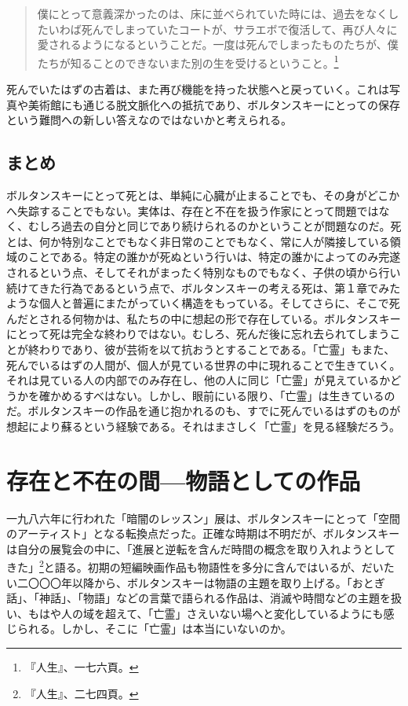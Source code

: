 \documentclass[b5j,twoside,twocolumn]{utarticle}
\begin{document}
\begin{quote}
僕にとって意義深かったのは、床に並べられていた時には、過去をなくしたいわば死んでしまっていたコートが、サラエボで復活して、再び人々に愛されるようになるということだ。一度は死んでしまったものたちが、僕たちが知ることのできないまた別の生を受けるということ。\footnote{『人生』、一七六頁。}
\end{quote}


死んでいたはずの古着は、また再び機能を持った状態へと戻っていく。これは写真や美術館にも通じる脱文脈化への抵抗であり、ボルタンスキーにとっての保存という難問への新しい答えなのではないかと考えられる。
\subsection{まとめ}
ボルタンスキーにとって死とは、単純に心臓が止まることでも、その身がどこかへ失踪することでもない。実体は、存在と不在を扱う作家にとって問題ではなく、むしろ過去の自分と同じであり続けられるのかということが問題なのだ。死とは、何か特別なことでもなく非日常のことでもなく、常に人が隣接している領域のことである。特定の誰かが死ぬという行いは、特定の誰かによってのみ完遂されるという点、そしてそれがまったく特別なものでもなく、子供の頃から行い続けてきた行為であるという点で、ボルタンスキーの考える死は、第１章でみたような個人と普遍にまたがっていく構造をもっている。そしてさらに、そこで死んだとされる何物かは、私たちの中に想起の形で存在している。ボルタンスキーにとって死は完全な終わりではない。むしろ、死んだ後に忘れ去られてしまうことが終わりであり、彼が芸術を以て抗おうとすることである。「亡霊」もまた、死んでいるはずの人間が、個人が見ている世界の中に現れることで生きていく。それは見ている人の内部でのみ存在し、他の人に同じ「亡霊」が見えているかどうかを確かめるすべはない。しかし、眼前にいる限り、「亡霊」は生きているのだ。ボルタンスキーの作品を通じ抱かれるのも、すでに死んでいるはずのものが想起により蘇るという経験である。それはまさしく「亡霊」を見る経験だろう。

\section{存在と不在の間—物語としての作品}
一九八六年に行われた「暗闇のレッスン」展は、ボルタンスキーにとって「空間のアーティスト」となる転換点だった。正確な時期は不明だが、ボルタンスキーは自分の展覧会の中に、「進展と逆転を含んだ時間の概念を取り入れようとしてきた」\footnote{『人生』、二七四頁。}と語る。初期の短編映画作品も物語性を多分に含んではいるが、だいたい二〇〇〇年以降から、ボルタンスキーは物語の主題を取り上げる。「おとぎ話」、「神話」、「物語」などの言葉で語られる作品は、消滅や時間などの主題を扱い、もはや人の域を超えて、「亡霊」さえいない場へと変化しているようにも感じられる。しかし、そこに「亡霊」は本当にいないのか。
\end{document}
